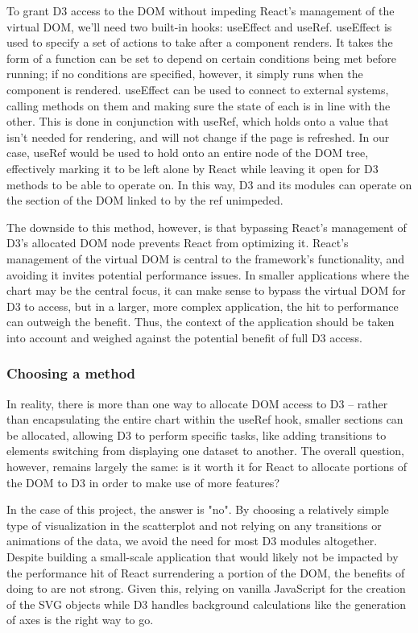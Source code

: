To grant D3 access to the DOM without impeding React's management of the virtual DOM, we'll need two built-in hooks: useEffect and useRef. useEffect is used to specify a set of actions to take after a component renders. It takes the form of a function can be set to depend on certain conditions being met before running; if no conditions are specified, however, it simply runs when the component is rendered. useEffect can be used to connect to external systems, calling methods on them and making sure the state of each is in line with the other. This is done in conjunction with useRef, which holds onto a value that isn't needed for rendering, and will not change if the page is refreshed. In our case, useRef would be used to hold onto an entire node of the DOM tree, effectively marking it to be left alone by React while leaving it open for D3 methods to be able to operate on. In this way, D3 and its modules can operate on the section of the DOM linked to by the ref unimpeded.

The downside to this method, however, is that bypassing React's management of D3's allocated DOM node prevents React from optimizing it. React's management of the virtual DOM is central to the framework's functionality, and avoiding it invites potential performance issues. In smaller applications where the chart may be the central focus, it can make sense to bypass the virtual DOM for D3 to access, but in a larger, more complex application, the hit to performance can outweigh the benefit\cite{meeks_d3js_2024}. Thus, the context of the application should be taken into account and weighed against the potential benefit of full D3 access.

\subsubsection{Choosing a method}

In reality, there is more than one way to allocate DOM access to D3 -- rather than encapsulating the entire chart within the useRef hook, smaller sections can be allocated, allowing D3 to perform specific tasks, like adding transitions to elements switching from displaying one dataset to another. The overall question, however, remains largely the same: is it worth it for React to allocate portions of the DOM to D3 in order to make use of more features?

In the case of this project, the answer is "no". By choosing a relatively simple type of visualization in the scatterplot and not relying on any transitions or animations of the data, we avoid the need for most D3 modules altogether. Despite building a small-scale application that would likely not be impacted by the performance hit of React surrendering a portion of the DOM, the benefits of doing to are not strong.  Given this, relying on vanilla JavaScript for the creation of the SVG objects while D3 handles background calculations like the generation of axes is the right way to go.

